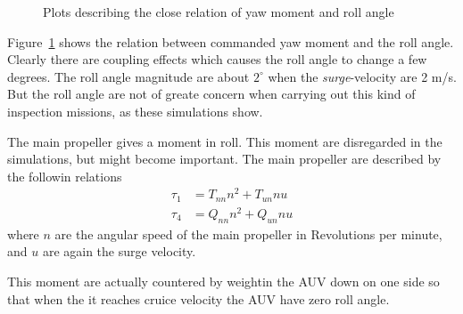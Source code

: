 	\begin{figure}[htbp]
		\centering
		\caption{Plots describing the close relation of yaw moment and roll angle}
		\label{fig:ch4_rollyawmoment}
	\end{figure}
	Figure~\ref{fig:ch4_rollyawmoment} shows the relation between commanded yaw moment and the roll angle.
	Clearly there are coupling effects which causes the roll angle to change a few degrees. The roll angle
	magnitude are about $2^\circ$ when the \textit{surge}-velocity are 2 m/s. But the roll angle are not
	of greate concern when carrying out this kind of inspection missions, as these simulations show.

	
	The main propeller gives a moment in roll. This moment are disregarded in the simulations, but might
	become important. The main propeller are described by the followin relations
	\begin{equation}
		\begin{aligned}
			\tau_1 &= T_{nn} n^2 + T_{un} n u \\
			\tau_4 &= Q_{nn} n^2 + Q_{un} n u
		\end{aligned}
	\end{equation}
	where $n$ are the angular speed of the main propeller in Revolutions per minute, and $u$ are again the
	surge velocity. 
	
	This moment are actually countered by weightin the AUV down on one side so that when the it reaches cruice
	velocity the AUV have zero roll angle. \cite{Bjorn_gjelstad_talk}

